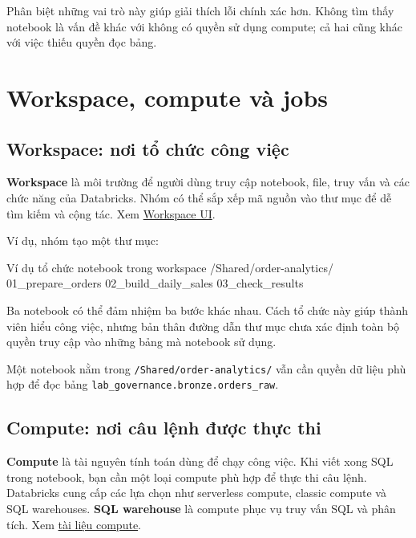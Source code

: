 Phân biệt những vai trò này giúp giải thích lỗi chính xác hơn. Không tìm thấy notebook là vấn đề khác với không có quyền sử dụng compute; cả hai cũng khác với việc thiếu quyền đọc bảng.


\FloatBarrier
{}
\section{Workspace, compute và jobs}

\FloatBarrier
{}
\subsection{Workspace: nơi tổ chức công việc}

\textbf{Workspace} là môi trường để người dùng truy cập notebook, file, truy vấn và các chức năng của Databricks. Nhóm có thể sắp xếp mã nguồn vào thư mục để dễ tìm kiếm và cộng tác. Xem \href{https://docs.databricks.com/aws/en/workspace/}{Workspace UI}.


Ví dụ, nhóm tạo một thư mục:


\begin{aivncodebox}[language={}]{Ví dụ tổ chức notebook trong workspace}
/Shared/order-analytics/
    01_prepare_orders
    02_build_daily_sales
    03_check_results
\end{aivncodebox}

Ba notebook có thể đảm nhiệm ba bước khác nhau. Cách tổ chức này giúp thành viên hiểu công việc, nhưng bản thân đường dẫn thư mục chưa xác định toàn bộ quyền truy cập vào những bảng mà notebook sử dụng.


Một notebook nằm trong \texttt{/\allowbreak{}Shared/\allowbreak{}order-analytics/\allowbreak{}} vẫn cần quyền dữ liệu phù hợp để đọc bảng \texttt{lab\_\allowbreak{}governance.\allowbreak{}bronze.\allowbreak{}orders\_\allowbreak{}raw}.


\FloatBarrier
{}
\subsection{Compute: nơi câu lệnh được thực thi}

\textbf{Compute} là tài nguyên tính toán dùng để chạy công việc. Khi viết xong SQL trong notebook, bạn cần một loại compute phù hợp để thực thi câu lệnh. Databricks cung cấp các lựa chọn như serverless compute, classic compute và SQL warehouses. \textbf{SQL warehouse} là compute phục vụ truy vấn SQL và phân tích. Xem \href{https://docs.databricks.com/aws/en/compute/}{tài liệu compute}.


